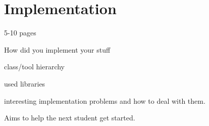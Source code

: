 \chapter{Implementation}

5-10 pages

How did you implement your stuff

class/tool hierarchy

used libraries

interesting implementation problems and how to deal with them.

Aims to help the next student get started.
